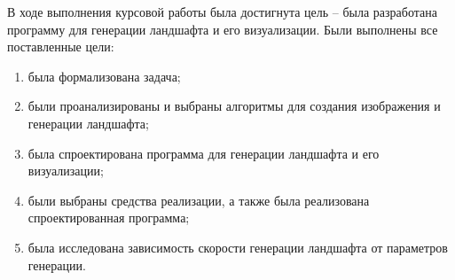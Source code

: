 
В ходе выполнения курсовой работы была достигнута цель -- была разработана программу для генерации ландшафта и его визуализации. Были выполнены все поставленные цели:

\begin{enumerate}
	\item была формализована задача;
	\item были проанализированы и выбраны алгоритмы для создания изображения и генерации ландшафта;
	\item была спроектирована программа для генерации ландшафта и его визуализации;
	\item были выбраны средства реализации, а также была реализована спроектированная программа;
	\item была исследована зависимость скорости генерации ландшафта от параметров генерации.
\end{enumerate}